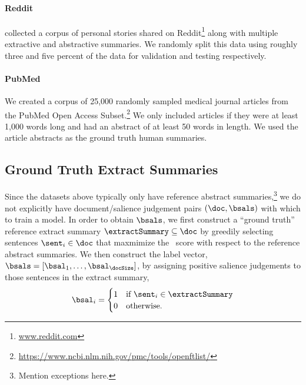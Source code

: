 \paragraph{Reddit} \citet{ouyang2017crowd} collected a corpus of personal 
    stories shared
 on Reddit\footnote{\url{www.reddit.com}} along with multiple extractive 
 and abstractive summaries. We randomly split this data using roughly three and five percent of the data for validation and testing respectively.

\paragraph{PubMed}{We created a corpus of 25,000 randomly sampled
    medical journal articles from the PubMed Open Access 
    Subset.\footnote{\url{https://www.ncbi.nlm.nih.gov/pmc/tools/openftlist/}}
    We only included articles if they were at least 1,000 words long and 
    had an abstract of at least 50 words in length.
We used the article abstracts as the ground truth human summaries.}

\subsection{Ground Truth Extract Summaries}
\label{sec:labelgen}
Since the datasets above typically only have reference abstract 
summaries,\footnote{\color{red}Mention exceptions here.} 
we do not explicitly have document/salience
judgement pairs $(\doc, \bsals)$ with which to train a model. In order to obtain 
$\bsals$,
we first construct a ``ground truth'' reference extract summary $\extractSummary \subseteq \doc$ by greedily
selecting sentences $\sent_i \in \doc$ that maxmimize the \rouge~score 
\citep{lin2004rouge} with respect to the reference abstract summaries.
We then construct the label vector, $\bsals = \left[\bsal_1,\ldots,\bsal_\docSize \right]$, by assigning positive salience
judgements to those sentences in the extract summary, 
\[
    \bsal_i = \begin{cases} 
        1  & \textrm{if $\sent_i \in \extractSummary$} \\ 
        0 & \textrm{otherwise.} \end{cases} 
\]





